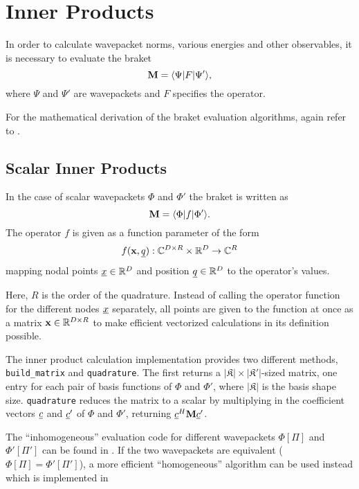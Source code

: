 \section{Inner Products}

In order to calculate wavepacket norms, various energies and other observables,
it is necessary to evaluate the braket
\begin{equation}
  \label{eq:braket}
  \mathbf{M} = \langle \Psi | F | \Psi' \rangle,
\end{equation}
where $\Psi$ and $\Psi'$ are wavepackets and $F$ specifies the operator.

For the mathematical derivation of the braket evaluation algorithms, again refer
to \cite{B_master_thesis}.


\subsection{Scalar Inner Products}

In the case of scalar wavepackets $\Phi$ and $\Phi'$ the braket is written as
\begin{equation}
  \mathbf{M} = \langle \Phi | f | \Phi' \rangle.
\end{equation}
The operator $f$ is given as a function parameter of the form
\begin{equation}
  f(\mathbf{x}, \underline{q}) : \mathbb{C}^{D \times R} \times \mathbb{R}^D \rightarrow
  \mathbb{C}^R
\end{equation}
mapping nodal points $\underline{x} \in \mathbb{R}^D$ and position
$\underline{q} \in \mathbb{R}^D$ to the operator's values.

Here, $R$ is the order of the quadrature.
Instead of calling the operator function for the different nodes $\underline{x}$
separately, all points are given to the function at once as a matrix $\mathbf{x}
\in \mathbb{R}^{D \times R}$ to make efficient vectorized calculations in its
definition possible.

The inner product calculation implementation provides two different methods,
\texttt{build\_matrix} and \texttt{quadrature}.
The first returns a $|\mathfrak{K}| \times |\mathfrak{K'}|$-sized matrix, one
entry for each pair of basis functions of $\Phi$ and $\Phi'$, where
$|\mathfrak{K}|$ is the basis shape size.
\texttt{quadrature} reduces the matrix to a scalar by multiplying in the
coefficient vectors $\underline{c}$ and $\underline{c}'$ of $\Phi$ and $\Phi'$, returning
$\underline{c}^H \mathbf{M} \underline{c}'$.

The ``inhomogeneous'' evaluation code for different wavepackets $\Phi[\Pi]$
and $\Phi'[\Pi']$ can be found in
.
If the two wavepackets are equivalent ($\Phi[\Pi] = \Phi'[\Pi']$), a more efficient
``homogeneous'' algorithm can be used instead which is implemented in


